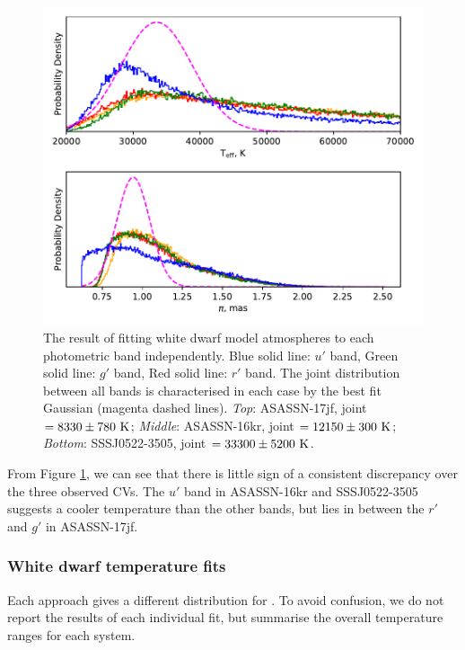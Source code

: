 \begin{figure}
    \includegraphics[width=\columnwidth, trim={0cm 6.5cm 0cm 0cm}, clip]{figures/results/three_cvs_with_weird_colours/SSS111126/PhysicalParams/all_gamma_SSS111126.pdf}
    \caption{The result of fitting white dwarf model atmospheres to each photometric band independently. Blue solid line: $u'$ band, Green solid line: $g'$ band, Red solid line: $r'$ band. The joint distribution between all bands is characterised in each case by the best fit Gaussian (magenta dashed lines). \textit{Top}: ASASSN-17jf, joint \teff$=8330\pm780\rm\ K$; \textit{Middle}: ASASSN-16kr, joint \teff$=12150\pm300\rm\ K$; \textit{Bottom}: SSSJ0522-3505, joint \teff$=33300\pm5200 \rm\ K$. }
    \label{fig:gamma fits}
\end{figure}

From Figure \ref{fig:gamma fits}, we can see that there is little sign of a consistent discrepancy over the three observed CVs. The $u'$ band in ASASSN-16kr and SSSJ0522-3505 suggests a cooler temperature than the other bands, but lies in between the $r'$ and $g'$ in ASASSN-17jf.


\subsubsection{White dwarf temperature fits}
\label{sect:white dwarf temperature report}

Each approach gives a different distribution for \teff.
To avoid confusion, we do not report the results of each individual fit, but summarise the overall temperature ranges for each system.

